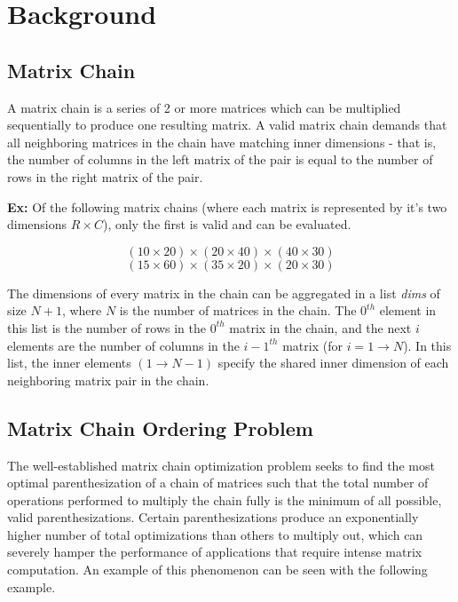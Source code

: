\documentclass[conference,leqno]{IEEEtran}
\begin{document}
\section{Background}
\subsection{Matrix Chain}
A matrix chain is a series of 2 or more matrices which can be multiplied sequentially to produce one resulting matrix. A valid matrix chain demands that all neighboring matrices in the chain have matching inner dimensions - that is, the number of columns in the left matrix of the pair is equal to the number of rows in the right matrix of the pair.

\textbf{Ex:} Of the following matrix chains (where each matrix is represented by it's two dimensions $R \times C$), only the first is valid and can be evaluated.

\begin{equation}
(10 \times 20) \times (20 \times 40) \times (40 \times 30)
\end{equation}
\begin{equation}
(15 \times 60) \times (35 \times 20) \times (20 \times 30)
\end{equation}

The dimensions of every matrix in the chain can be aggregated in a list \emph{dims} of size $N + 1$, where $N$ is the number of matrices in the chain. The $0^{th}$ element in this list is the number of rows in the $0^{th}$ matrix in the chain, and the next $i$ elements are the number of columns in the $i-1^{th}$ matrix (for $i=1 \rightarrow N$). In this list, the inner elements $(1 \rightarrow N - 1)$ specify the shared inner dimension of each neighboring matrix pair in the chain.

\subsection{Matrix Chain Ordering Problem}
The well-established matrix chain optimization problem seeks to find the most optimal parenthesization of a chain of matrices such that the total number of operations performed to multiply the chain fully is the minimum of all possible, valid parenthesizations. Certain parenthesizations produce an exponentially higher number of total optimizations than others to multiply out, which can severely hamper the performance of applications that require intense matrix computation. An example of this phenomenon can be seen with the following example.
\end{document}
